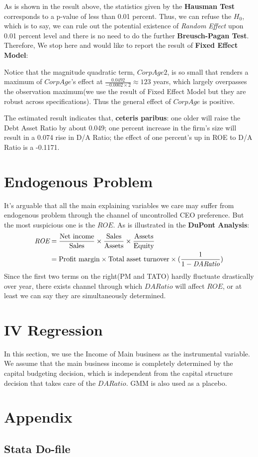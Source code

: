 \documentclass{article}
\begin{document}
As is shown in the result above, the statistics given by the {\bf Hausman Test} corresponds to a p-value of less than 0.01 percent. Thus, we can refuse the $H_0$, which is to say, we can rule out the potential existence of {\it Random Effect} upon 0.01 percent level and there is no need to do the further {\bf Breusch-Pagan Test}. 
Therefore, We stop here and would like to report the result of {\bf Fixed Effect Model}:

Notice that the magnitude quadratic term, $CorpAge2$, is so small that renders a maximum of $CorpAge$'s effect at $\frac{0.0492}{-0.0002\times2}\approx 123$ years, which largely overpasses the observation maximum(we use the result of Fixed Effect Model but they are robust across specifications). Thus the general effect of $CorpAge$ is positive.

The estimated result indicates that, {\bf ceteris paribus}: one older will raise the Debt Asset Ratio by about 0.049; one percent increase in the firm's size will result in a 0.074 rise in D/A Ratio; the effect of one percent's up in ROE to D/A Ratio is a -0.1171.

\newpage
\section{Endogenous Problem}\label{sec:endogenous}
It's arguable that all the main explaining variables we care may suffer from endogenous problem through the channel of uncontrolled CEO preference. But the most suspicious one is the $ROE$. As is illustrated in the {\bf DuPont Analysis}:
\begin{align}
	\notag
	\textit{ROE} &= \frac{\text{Net income}}{\text{Sales}}\times\frac{\text{Sales}}{\text{Assets}}\times\frac{\text{Assets}}{\text{Equity}}\\
	&= \text{Profit margin}\times\text{Total asset turnover}\times(\frac{1}{1-\textit{DARatio}})
\end{align}
Since the first two terms on the right(PM and TATO) hardly fluctuate drastically over year, there exists channel through which $DARatio$ will affect $ROE$, or at least we can say they are simultaneously determined.

\section{IV Regression}\label{sec:IV}
In this section, we use the Income of Main business as the instrumental variable. We assume that the main business income is completely determined by the capital budgeting decision, which is independent from the capital structure decision that takes care of the $DARatio$. GMM is also used as a placebo.


\newpage
\begin{appendix}\label{sec:appendix}
\section{Appendix}
\subsection{Stata Do-file}

\nocite{*}


\end{appendix}
\end{document}
